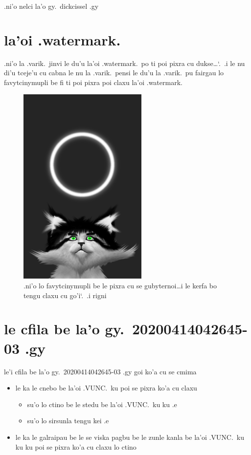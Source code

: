 \documentclass{report}
\newcommand\sds{\spacefactor\sfcode`.\ \space}
\begin{document}
.ni'o nelci la'o gy.\ dickcissel .gy

\section{la'oi .watermark.}
.ni'o la .varik.\ jinvi le du'u la'oi .watermark.\ po ti poi pixra cu dukse\ldots\sds .i le nu di'u tceje'u cu cabna le nu la .varik.\ pensi le du'u la .varik.\ pu fairgau lo favytcinymupli be fi ti poi pixra poi claxu la'oi .watermark.

\begin{figure}[ht]
	\centering
	\includegraphics[height=10cm]{20200414042645-03/20200414042645-03-uw.png}
	\caption[center]{.ni'o lo favytcinymupli be le pixra cu se gubyternoi\ldots i le kerfa bo tengu claxu cu go'i\sds  .i rigni}
\end{figure}

\section{le cfila be la'o gy.\ 20200414042645-03 .gy}
le'i cfila be la'o gy.\ 20200414042645-03 .gy goi ko'a cu se cmima
\begin{itemize}
	\item le ka le cnebo be la'oi .VUNC.\ ku poi se pixra ko'a cu claxu
	\begin{itemize}
		\item su'o lo ctino be le stedu be la'oi .VUNC.\ ku ku .e
		\item su'o lo sirsunla tengu kei .e
	\end{itemize}
	\item le ka le galraipau be le se viska pagbu be le zunle kanla be la'oi .VUNC.\ ku ku ku poi se pixra ko'a cu claxu lo ctino
\end{itemize}
\end{document}
